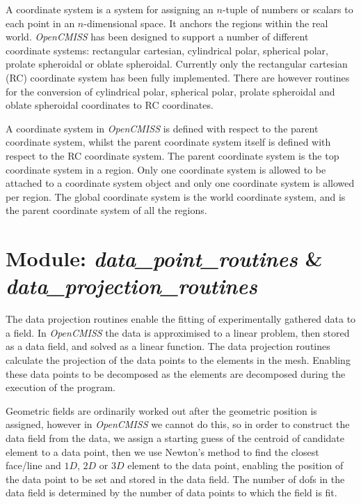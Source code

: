 A coordinate system is a system for assigning an $n$-tuple of numbers or
scalars to each point in an $n$-dimensional space. It anchors the regions 
within the real world. \emph{OpenCMISS} has been designed to support a number 
of different coordinate systems: rectangular cartesian, cylindrical polar, 
spherical polar, prolate spheroidal or oblate spheroidal. Currently only the 
rectangular cartesian (RC) coordinate system has been fully implemented. 
There are however routines for the conversion of cylindrical polar, spherical 
polar, prolate spheroidal and oblate spheroidal coordinates to RC coordinates.

A coordinate system in \emph{OpenCMISS} is defined with respect to the parent 
coordinate system, whilst the parent coordinate system itself is defined with 
respect to the RC coordinate system. The parent coordinate system is the top 
coordinate system in a region. Only one coordinate system is allowed to be 
attached to a coordinate system object and only one coordinate system is 
allowed per region. The global coordinate system is the world coordinate 
system, and is the parent coordinate system of all the regions. 


\section{Module: \emph{data\_point\_routines} \&  \\ 
\emph{data\_projection\_routines}}
\label{sec:dataprojectionroutines}

The data projection routines enable the fitting of experimentally gathered 
data to a field. In \emph{OpenCMISS} the data is approximised to a linear 
problem, then stored as a data field, and solved as a linear function. The 
data projection routines calculate the projection of the data points to the 
elements in the mesh. Enabling these data points to be decomposed as the 
elements are decomposed during the execution of the program. 

Geometric fields are ordinarily worked out after the geometric position is 
assigned, however in \emph{OpenCMISS} we cannot do this, so in order to 
construct the data field from the data, we assign a starting guess of the 
centroid of candidate element to a data point, then we use Newton's method to 
find the closest face/line and $1D$, $2D$ or $3D$ element to the data point, 
enabling the position of the data point to be set and stored in the data field. 
The number of dofs in the data field is determined by the number of data points 
to which the field is fit.

